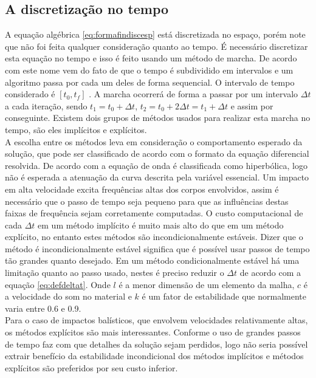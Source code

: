 \subsection{A discretização no tempo}

A equação algébrica \ref{eq:formafindiscesp} está discretizada no espaço, porém note que não foi feita qualquer consideração quanto ao tempo. É necessário discretizar esta equação no tempo e isso é feito usando um método de marcha. De acordo com \cite{Paulo} este nome vem do fato de que o tempo é subdividido em intervalos e um algoritmo passa por cada um deles de forma sequencial. O intervalo de tempo considerado é $[t_0,t_f] $ . A marcha ocorrerá de forma a passar por um intervalo $ \Delta t $ a cada iteração, sendo $ t_1 = t_0 + \Delta t $, $ t_2 = t_0 + 2 \Delta t = t_1 + \Delta t $ e assim por conseguinte. Existem dois grupos de métodos usados para realizar esta marcha no tempo, são eles implícitos e explícitos. \\

A escolha entre os métodos leva em consideração o comportamento esperado da solução, que pode ser classificado de acordo com o formato da equação diferencial resolvida. De acordo com \cite{BangerthHartmannKanschat2007} a equação de onda é classificada como hiperbólica, logo não é esperada a atenuação da curva descrita pela variável essencial. Um impacto em alta velocidade excita frequências altas dos corpos envolvidos, assim é necessário que o passo de tempo seja pequeno para que as influências destas faixas de frequência sejam corretamente computadas. O custo computacional de cada $\Delta t$ em um método implícito é muito mais alto do que em um método explícito, no entanto estes métodos são incondicionalmente estáveis. Dizer que o método é incondicionalmente estável significa que é possível usar passos de tempo tão grandes quanto desejado. Em um método condicionalmente estável há uma limitação quanto ao passo usado, nestes é preciso reduzir o $ \Delta t $ de acordo com a equação \ref{eq:defdeltat}. Onde $l$ é a menor dimensão de um elemento da malha, $c$ é a velocidade do som no material e $k$ é um fator de estabilidade que normalmente varia entre 0.6 e 0.9. \\


Para o caso de impactos balísticos, que envolvem velocidades relativamente altas, os métodos explícitos são mais interessantes. Conforme \cite{Zukas} o uso de grandes passos de tempo faz com que detalhes da solução sejam perdidos, logo não seria possível extrair benefício da estabilidade incondicional dos métodos implícitos e métodos explícitos são preferidos por seu custo inferior. \\

